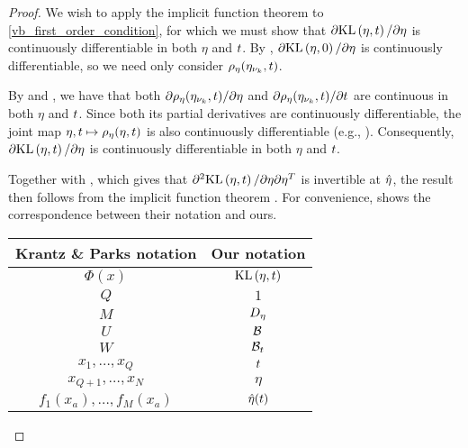 \begin{thm}
\begin{proof}
We wish to apply the implicit function theorem to
\eqref{vb_first_order_condition}, for which we must show that $\partial
\mathrm{KL}\left(\eta, t\right) / \partial \eta$ is continuously differentiable in both $\eta$ and
$t$.  By , $\partial \mathrm{KL}\left(\eta, 0\right) /
\partial \eta$ is continuously differentiable, so we need only consider
$\rho_\eta(\eta_{\nu_{k}}, t)$.

By  and , we
have that both $\partial \rho_\eta(\eta_{\nu_{k}}, t) / \partial \eta$ and $\partial
\rho_\eta(\eta_{\nu_{k}}, t) / \partial t$ are continuous in both $\eta$ and $t$.
Since both its partial derivatives are continuously differentiable, the joint
map $\eta, t \mapsto \rho_\eta(\eta, t)$ is also continuously differentiable
(e.g., \citet[Theorem 3.2]{fleming:2012:functions}).  Consequently, $\partial
\mathrm{KL}\left(\eta, t\right) / \partial \eta$ is continuously differentiable in both $\eta$ and
$t$.


Together with , which gives that $\partial^2
\mathrm{KL}\left(\eta, t\right) / \partial \eta \partial\eta^T$ is invertible at $\hat\eta$, the
result then follows from the implicit function theorem \citet[Theorem
3.3.1]{krantz:2012:implicit}. For convenience,  shows the
correspondence between their notation and ours.

\begin{center}
\begin{tabular}{|c|c|}
%
\hline Krantz \& Parks notation & Our notation \\\hline
$\Phi(x)$                       & $\mathrm{KL}\left(\eta, t\right)$ \\\hline
$Q$                             & $1$ \\\hline
$M$                             & ${D_{\eta}}$ \\\hline
$U$                             & $\mathcal{B}$ \\\hline
$W$                             & $\mathcal{B}_t$ \\\hline
$x_1,\ldots,x_Q$                & $t$ \\\hline
$x_{Q+1},\ldots,x_N$            & $\eta$ \\\hline
$f_1(x_a), \ldots,f_M(x_a)$     & $\hat\eta(t)$ \\\hline
%
\end{tabular}
\end{center}
%
\end{proof}
%
\end{thm}

